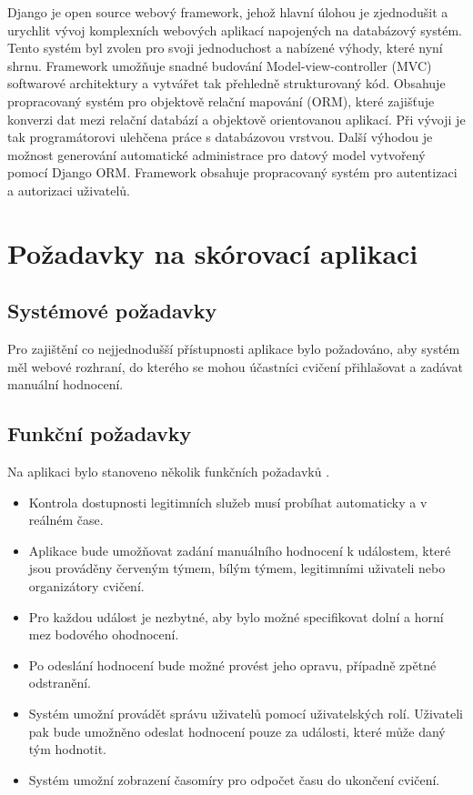 \documentclass[
  digital, %
  twoside, %
  table,   %
  nolof,     %
  nolot,     %
]{fithesis3}
\begin{document}
Django je open source webový framework, jehož hlavní úlohou je zjednodušit a urychlit vývoj komplexních webových aplikací napojených na databázový systém. Tento systém byl zvolen pro svoji jednoduchost a nabízené výhody, které nyní shrnu. Framework umožňuje snadné budování Model-view-controller (MVC) softwarové architektury a vytvářet tak přehledně strukturovaný kód. Obsahuje propracovaný systém pro objektově relační mapování (ORM), které zajišťuje konverzi dat mezi relační databází a objektově orientovanou aplikací. Při vývoji je tak programátorovi ulehčena práce s databázovou vrstvou. Další výhodou je možnost generování automatické administrace pro datový model vytvořený pomocí Django ORM. Framework obsahuje propracovaný systém pro autentizaci a autorizaci uživatelů. 

\section{Požadavky na skórovací aplikaci}

\subsection{Systémové požadavky}
Pro zajištění co nejjednodušší přístupnosti aplikace bylo požadováno, aby systém měl webové rozhraní, do kterého se mohou účastníci cvičení přihlašovat a zadávat manuální hodnocení.

\subsection{Funkční požadavky}
Na aplikaci bylo stanoveno několik funkčních požadavků \cite{Kostelnik2016thesis}.
\begin{itemize}
\item Kontrola dostupnosti legitimních služeb musí probíhat automaticky a v reálném čase.
\item Aplikace bude umožňovat zadání manuálního hodnocení k událostem, které jsou prováděny červeným týmem, bílým týmem, legitimními uživateli nebo organizátory cvičení.
\item Pro každou událost je nezbytné, aby bylo možné specifikovat dolní a horní mez bodového ohodnocení.
\item Po odeslání hodnocení bude možné provést jeho opravu, případně zpětné odstranění.
\item Systém umožní provádět správu uživatelů pomocí uživatelských rolí. Uživateli pak bude umožněno odeslat hodnocení pouze za události, které může daný tým hodnotit.
\item Systém umožní zobrazení časomíry pro odpočet času do ukončení cvičení.
\end{itemize}
\end{document}
